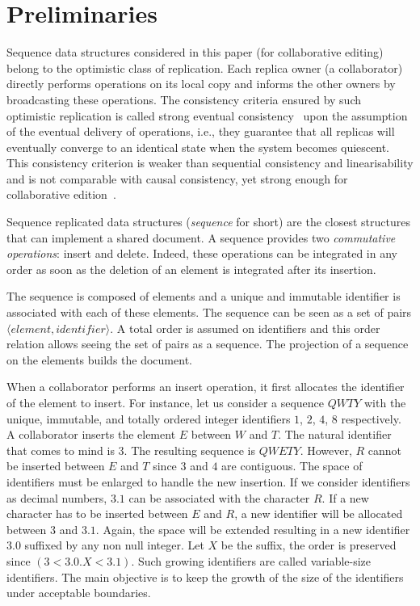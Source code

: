 
\section{Preliminaries}
\label{sec:preliminaries}

Sequence data structures considered in this paper (for collaborative
editing) belong to the optimistic class of replication. Each replica owner (a
collaborator) directly performs operations on its local copy and informs the
other owners by broadcasting these operations. The consistency criteria ensured
by such optimistic replication is called strong eventual
consistency~\cite{shapiro2011comprehensive} upon the assumption of the eventual
delivery of operations, i.e., they guarantee that all replicas will eventually
converge to an identical state when the system becomes quiescent. This
consistency criterion is weaker than sequential consistency and linearisability
and is not comparable with causal consistency, yet strong enough for
collaborative edition~\cite{shapiro2011comprehensive}.

Sequence replicated data structures (\emph{sequence} for short) are the closest
structures that can implement a shared document. A sequence provides two
\emph{commutative operations}: insert and delete. Indeed, these operations can
be integrated in any order as soon as the deletion of an element is integrated
after its insertion.

The sequence is composed of elements and a unique and immutable identifier is
associated with each of these elements. The sequence can be seen as a set of
pairs $\langle element, identifier \rangle$. A total order is assumed on
identifiers and this order relation allows seeing the set of pairs as a
sequence. The projection of a sequence on the elements builds the document.

When a collaborator performs an insert operation, it first allocates the
identifier of the element to insert. For instance, let us consider a sequence
$QWTY$ with the unique, immutable, and totally ordered integer identifiers $1$,
$2$, $4$, $8$ respectively. A collaborator inserts the element $E$ between $W$
and $T$. The natural identifier that comes to mind is $3$. The resulting
sequence is $QWETY$. However, $R$ cannot be inserted between $E$ and $T$ since
$3$ and $4$ are contiguous. The space of identifiers must be enlarged to handle
the new insertion. If we consider identifiers as decimal numbers, $3.1$ can be
associated with the character $R$. If a new character has to be inserted
between $E$ and $R$, a new identifier will be allocated between $3$ and
$3.1$. Again, the space will be extended resulting in a new identifier $3.0$
suffixed by any non null integer. Let $X$ be the suffix, the order is preserved
since $(3 < 3.0.X < 3.1)$. Such growing identifiers are called variable-size
identifiers. The main objective is to keep the growth of the size of the
identifiers under acceptable boundaries.

